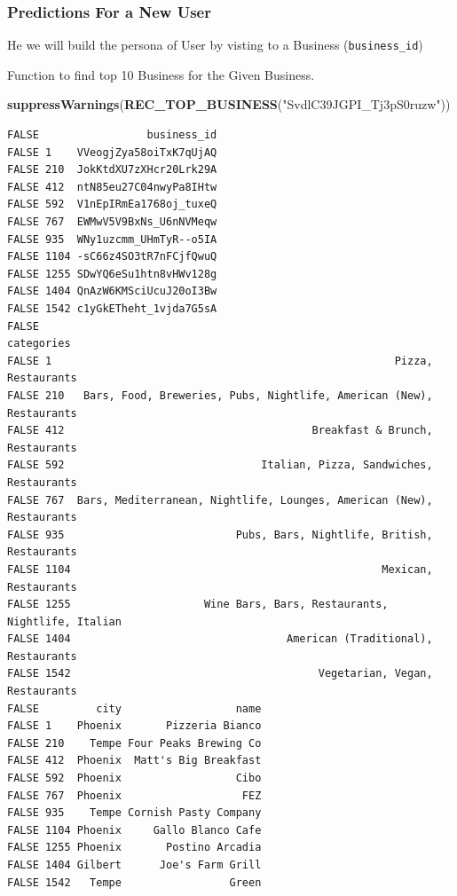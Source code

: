 \documentclass[]{article}
\newenvironment{Shaded}{\begin{snugshade}}{\end{snugshade}}
\newcommand{\KeywordTok}[1]{\textcolor[rgb]{0.13,0.29,0.53}{\textbf{#1}}}
\newcommand{\NormalTok}[1]{#1}
\newcommand{\StringTok}[1]{\textcolor[rgb]{0.31,0.60,0.02}{#1}}
\begin{document}
\hypertarget{predictions-for-a-new-user}{%
\subsubsection{Predictions For a New
User}\label{predictions-for-a-new-user}}

He we will build the persona of User by visting to a Business
(\texttt{business\_id})

Function to find top 10 Business for the Given Business.

\begin{Shaded}
\begin{Highlighting}[]
\KeywordTok{suppressWarnings}\NormalTok{(}\KeywordTok{REC_TOP_BUSINESS}\NormalTok{(}\StringTok{"SvdlC39JGPI_Tj3pS0ruzw"}\NormalTok{))}
\end{Highlighting}
\end{Shaded}

\begin{verbatim}
FALSE                 business_id
FALSE 1    VVeogjZya58oiTxK7qUjAQ
FALSE 210  JokKtdXU7zXHcr20Lrk29A
FALSE 412  ntN85eu27C04nwyPa8IHtw
FALSE 592  V1nEpIRmEa1768oj_tuxeQ
FALSE 767  EWMwV5V9BxNs_U6nNVMeqw
FALSE 935  WNy1uzcmm_UHmTyR--o5IA
FALSE 1104 -sC66z4SO3tR7nFCjfQwuQ
FALSE 1255 SDwYQ6eSu1htn8vHWv128g
FALSE 1404 QnAzW6KMSciUcuJ20oI3Bw
FALSE 1542 c1yGkETheht_1vjda7G5sA
FALSE                                                                categories
FALSE 1                                                      Pizza, Restaurants
FALSE 210   Bars, Food, Breweries, Pubs, Nightlife, American (New), Restaurants
FALSE 412                                       Breakfast & Brunch, Restaurants
FALSE 592                               Italian, Pizza, Sandwiches, Restaurants
FALSE 767  Bars, Mediterranean, Nightlife, Lounges, American (New), Restaurants
FALSE 935                           Pubs, Bars, Nightlife, British, Restaurants
FALSE 1104                                                 Mexican, Restaurants
FALSE 1255                     Wine Bars, Bars, Restaurants, Nightlife, Italian
FALSE 1404                                  American (Traditional), Restaurants
FALSE 1542                                       Vegetarian, Vegan, Restaurants
FALSE         city                  name
FALSE 1    Phoenix       Pizzeria Bianco
FALSE 210    Tempe Four Peaks Brewing Co
FALSE 412  Phoenix  Matt's Big Breakfast
FALSE 592  Phoenix                  Cibo
FALSE 767  Phoenix                   FEZ
FALSE 935    Tempe Cornish Pasty Company
FALSE 1104 Phoenix     Gallo Blanco Cafe
FALSE 1255 Phoenix       Postino Arcadia
FALSE 1404 Gilbert      Joe's Farm Grill
FALSE 1542   Tempe                 Green
\end{verbatim}
\end{document}
